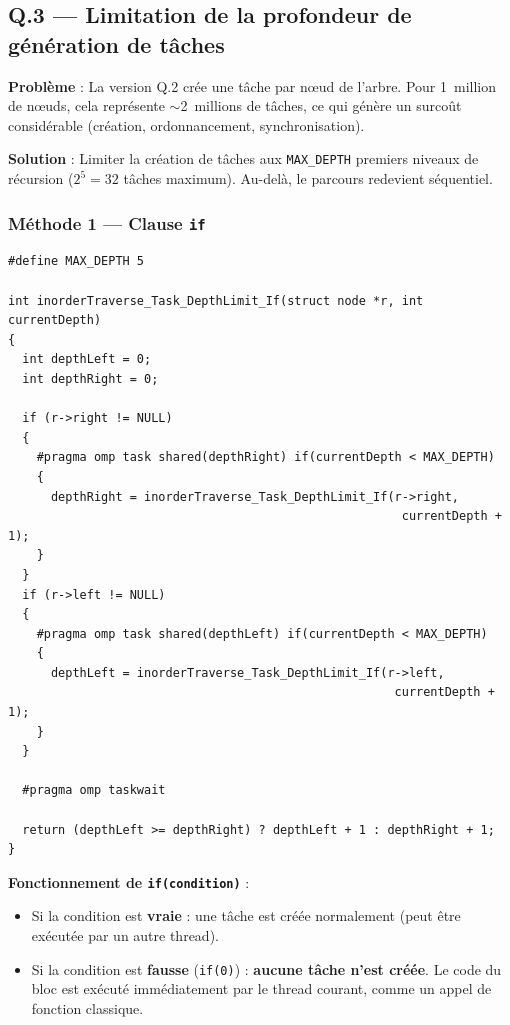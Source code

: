 \documentclass[12pt,a4paper]{article}
\begin{document}
\subsection{Q.3 --- Limitation de la profondeur de génération de tâches}

\textbf{Problème} : La version Q.2 crée une tâche par n\oe ud de l'arbre. Pour
1~million de n\oe uds, cela représente $\sim$2~millions de tâches, ce qui génère
un surcoût considérable (création, ordonnancement, synchronisation).

\textbf{Solution} : Limiter la création de tâches aux \texttt{MAX\_DEPTH}
premiers niveaux de récursion ($2^5 = 32$ tâches maximum). Au-delà, le parcours
redevient séquentiel.

\subsubsection{Méthode 1 --- Clause \texttt{if}}

\begin{lstlisting}[caption={Limite de profondeur avec clause \texttt{if} --- Q.3a}]
#define MAX_DEPTH 5

int inorderTraverse_Task_DepthLimit_If(struct node *r, int currentDepth)
{
  int depthLeft = 0;
  int depthRight = 0;

  if (r->right != NULL)
  {
    #pragma omp task shared(depthRight) if(currentDepth < MAX_DEPTH)
    {
      depthRight = inorderTraverse_Task_DepthLimit_If(r->right,
                                                       currentDepth + 1);
    }
  }
  if (r->left != NULL)
  {
    #pragma omp task shared(depthLeft) if(currentDepth < MAX_DEPTH)
    {
      depthLeft = inorderTraverse_Task_DepthLimit_If(r->left,
                                                      currentDepth + 1);
    }
  }

  #pragma omp taskwait

  return (depthLeft >= depthRight) ? depthLeft + 1 : depthRight + 1;
}
\end{lstlisting}

\textbf{Fonctionnement de \texttt{if(condition)}} :
\begin{itemize}
  \item Si la condition est \textbf{vraie} : une tâche est créée normalement
    (peut être exécutée par un autre thread).
  \item Si la condition est \textbf{fausse} (\texttt{if(0)}) :
    \textbf{aucune tâche n'est créée}. Le code du bloc est exécuté immédiatement
    par le thread courant, comme un appel de fonction classique.
\end{itemize}
\end{document}
